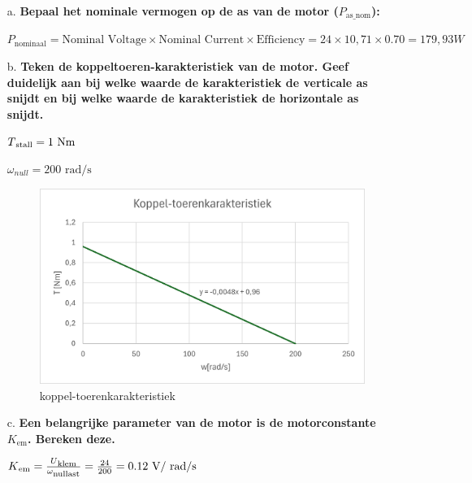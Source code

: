 \begin{enumerate}
    \item [a.] \textbf{Bepaal het nominale vermogen op de as van de motor ($P_{\text{as\_nom}}$):}
    
        $P_{\text{nominaal}} = \text{Nominal Voltage} \times \text{Nominal Current} \times \text{Efficiency} = 24 \times 10,71 \times 0.70 = 179,93W$



    \item [b.] \textbf{Teken de koppeltoeren-karakteristiek van de motor. Geef duidelijk aan bij
    welke waarde de karakteristiek de verticale as snijdt en bij welke waarde de
    karakteristiek de horizontale as snijdt.}


        $T\textsubscript{stall} = 1 \text{ Nm}$

        $\omega_{null} = 200 \text{ rad/s}$

        \begin{figure}[h]
            \centering
            \includegraphics[scale=0.7]{koppel-toerenkarakteristiek 1b.png}
            \caption{koppel-toerenkarakteristiek}
        \end{figure}

    \item [c.] \textbf{Een belangrijke parameter van de motor is de motorconstante $K_{\text{em}}$.
    Bereken deze.}

        $K\textsubscript{em} = \frac{U\textsubscript{klem}}{\omega\textsubscript{nullast}} = \frac{24}{200} = 0.12 \text{ V/ rad/s}$


\end{enumerate}
